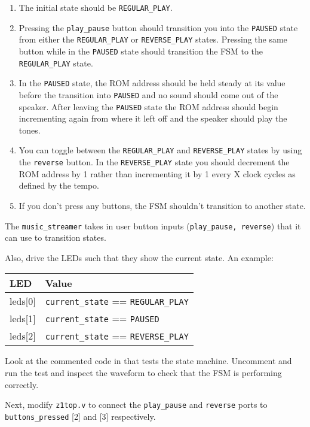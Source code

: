 \documentclass[11pt]{article}
\newcommand*\ttvar[1]{\texttt{\expandafter\dottvar\detokenize{#1}\relax}}
\newcommand*\dottvar[1]{\ifx\relax#1\else
  \expandafter\ifx\string_#1\string_\allowbreak\else#1\fi
  \expandafter\dottvar\fi}
\begin{document}
\begin{enumerate}
  \item The initial state should be \verb|REGULAR_PLAY|.
  \item Pressing the \verb|play_pause| button should transition you into the \verb|PAUSED| state from either the \verb|REGULAR_PLAY| or \verb|REVERSE_PLAY| states. Pressing the same button while in the \verb|PAUSED| state should transition the FSM to the \verb|REGULAR_PLAY| state.
  \item In the \verb|PAUSED| state, the ROM address should be held steady at its value before the transition into \verb|PAUSED| and no sound should come out of the speaker. After leaving the \verb|PAUSED| state the ROM address should begin incrementing again from where it left off and the speaker should play the tones.
  \item You can toggle between the \verb|REGULAR_PLAY| and \verb|REVERSE_PLAY| states by using the \verb|reverse| button. In the \verb|REVERSE_PLAY| state you should decrement the ROM address by 1 rather than incrementing it by 1 every X clock cycles as defined by the tempo.
  \item If you don't press any buttons, the FSM shouldn't transition to another state.
\end{enumerate}

The \verb|music_streamer| takes in user button inputs (\verb|play_pause, reverse|) that it can use to transition states.

Also, drive the LEDs such that they show the current state. An example:
\renewcommand{\arraystretch}{1.5}
\begin{center}
\begin{tabular}{| l | l |}
  \hline
  \textbf{LED} & \textbf{Value} \\ \hline
      leds[0] & \verb|current_state| == \verb|REGULAR_PLAY| \\ \hline
      leds[1] & \verb|current_state| == \verb|PAUSED| \\ \hline
      leds[2] & \verb|current_state| == \verb|REVERSE_PLAY| \\ \hline
\end{tabular}
\end{center}

Look at the commented code in \ttvar{music_streamer_testbench.v} that tests the state machine.
Uncomment and run the test and inspect the waveform to check that the FSM is performing correctly.

Next, modify \verb|z1top.v| to connect the \verb|play_pause| and \verb|reverse| ports to \verb|buttons_pressed| [2] and [3] respectively.
\end{document}
